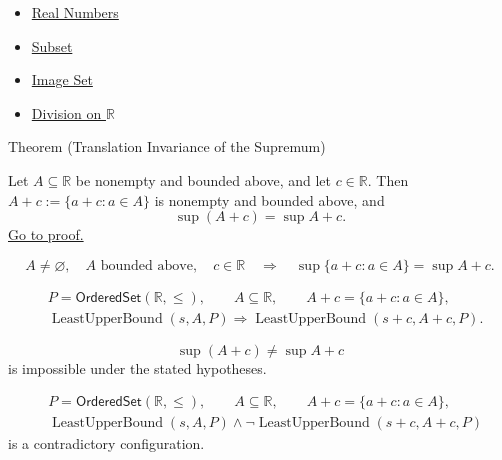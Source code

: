 \begin{dependencies}
\begin{itemize}
  \item \hyperref[def:reals]{Real Numbers}
  \item \hyperref[def:subset]{Subset}
  \item \hyperref[def:image-set]{Image Set}
  \item \hyperref[def:division-on-r]{Division on $\mathbb{R}$}
\end{itemize}
\end{dependencies}


\begin{theorembox}{Theorem (Translation Invariance of the Supremum)}
\begin{theorem}
\label{thm:translation-invariance-supremum}
Let $A\subseteq\mathbb{R}$ be nonempty and bounded above, and let
$c\in\mathbb{R}$.  Then $A+c:=\{a+c:a\in A\}$ is nonempty and bounded above,
and
\[
  \sup(A+c)=\sup A+c.
\]
\hyperref[prf:translation-invariance-supremum]{Go to proof.}
\end{theorem}
\end{theorembox}

\begin{remark*}
\[
A\neq\varnothing,\quad A\text{ bounded above},\quad c\in\mathbb{R}
\quad\Longrightarrow\quad
\sup\{a+c:a\in A\}=\sup A+c.
\]
\end{remark*}

\begin{remark*}
\[
\begin{aligned}
&P=\mathsf{OrderedSet}(\mathbb{R},\leq),\qquad A\subseteq\mathbb{R},\qquad A+c=\{a+c:a\in A\},\\
&\operatorname{LeastUpperBound}(s,A,P)
\Longrightarrow
\operatorname{LeastUpperBound}(s+c,A+c,P).
\end{aligned}
\]
\end{remark*}

\begin{remark*}
\[
\sup(A+c)\ne \sup A+c
\]
is impossible under the stated hypotheses.
\end{remark*}

\begin{remark*}
\[
\begin{aligned}
&P=\mathsf{OrderedSet}(\mathbb{R},\leq),\qquad A\subseteq\mathbb{R},\qquad A+c=\{a+c:a\in A\},\\
&\operatorname{LeastUpperBound}(s,A,P)\land
\neg\operatorname{LeastUpperBound}(s+c,A+c,P)
\end{aligned}
\]
is a contradictory configuration.
\end{remark*}

